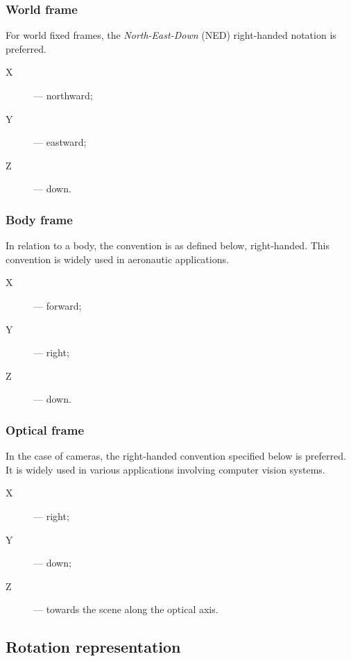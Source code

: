\subsubsection{World frame}

For world fixed frames, the \emph{North-East-Down} (NED) right-handed notation is preferred.
\begin{samepage}
\begin{description}
    \item[X] --- northward;
    \item[Y] --- eastward;
    \item[Z] --- down.
\end{description}
\end{samepage}

\subsubsection{Body frame}

In relation to a body, the convention is as defined below, right-handed.
This convention is widely used in aeronautic applications.
\begin{samepage}
\begin{description}
    \item[X] --- forward;
    \item[Y] --- right;
    \item[Z] --- down.
\end{description}
\end{samepage}

\subsubsection{Optical frame}

In the case of cameras, the right-handed convention specified below is preferred.
It is widely used in various applications involving computer vision systems.
\begin{samepage}
\begin{description}
    \item[X] --- right;
    \item[Y] --- down;
    \item[Z] --- towards the scene along the optical axis.
\end{description}
\end{samepage}

\subsection{Rotation representation}

